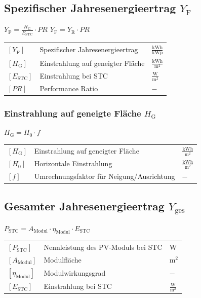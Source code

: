 \columnbreak
\subsection{Spezifischer Jahresenergieertrag $Y_\mathrm{F}$}
$\boxed{Y_\mathrm{F} = \frac{H_\mathrm{G}}{E_\mathrm{STC}} \cdot PR}$
$\boxed{Y_\mathrm{F} = Y_\mathrm{R} \cdot PR}$

\renewcommand{\arraystretch}{1.2}
\begin{tabular}{@{} l p{6.5cm} l @{}}
    $[Y_\mathrm{F}]$      & Spezifischer Jahresenergieertrag \dotfill & $\frac{\mathrm{kWh}}{\mathrm{kWp}}$ \\
    $[H_\mathrm{G}]$      & Einstrahlung auf geneigter Fläche \dotfill & $\frac{\mathrm{kWh}}{\mathrm{m^2}}$ \\
    $[E_\mathrm{STC}]$    & Einstrahlung bei STC              \dotfill & $\frac{\mathrm{W}}{\mathrm{m^2}}$ \\
    $[PR]$                & Performance Ratio                 \dotfill & $-$ \\
\end{tabular}

\subsubsection{Einstrahlung auf geneigte Fläche $H_\mathrm{G}$}
$\boxed{H_\mathrm{G} = H_0 \cdot f}$

\renewcommand{\arraystretch}{1.2}
\begin{tabular}{@{} l p{6.5cm} l @{}}
    $[H_\mathrm{G}]$  & Einstrahlung auf geneigter Fläche     \dotfill & $\frac{\mathrm{kWh}}{\mathrm{m^2}}$ \\
    $[H_0]$           & Horizontale Einstrahlung              \dotfill & $\frac{\mathrm{kWh}}{\mathrm{m^2}}$ \\
    $[f]$             & Umrechnungsfaktor für Neigung/Ausrichtung \dotfill & $-$ \\
\end{tabular}


\vspace{0.4cm}

\subsection{Gesamter Jahresenergieertrag $Y_\mathrm{ges}$}

$\boxed{P_\mathrm{STC} = A_\mathrm{Modul} \cdot \eta_\mathrm{Modul} \cdot E_\mathrm{STC}}$

\renewcommand{\arraystretch}{1.2}
\begin{tabular}{@{} l p{6.5cm} l @{}}
    $[P_\mathrm{STC}]$       & Nennleistung des PV-Moduls bei STC         \dotfill & $\mathrm{W}$ \\
    $[A_\mathrm{Modul}]$     & Modulfläche                                \dotfill & $\mathrm{m^2}$ \\
    $[\eta_\mathrm{Modul}]$  & Modulwirkungsgrad                           \dotfill & $-$ \\
    $[E_\mathrm{STC}]$       & Einstrahlung bei STC                        \dotfill & $\frac{\mathrm{W}}{\mathrm{m^2}}$ \\
\end{tabular}


